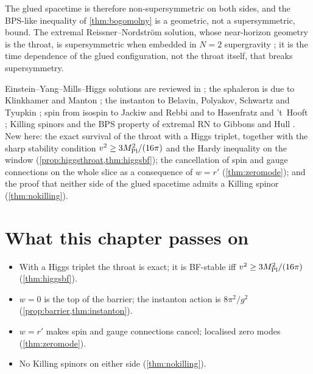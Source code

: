 The glued spacetime is therefore non-supersymmetric on both sides, and the BPS-like inequality of \cref{thm:bogomolny} is a geometric, not a supersymmetric, bound. The extremal Reissner--Nordstr\"om solution, whose near-horizon geometry is the throat, is supersymmetric when embedded in $N=2$ supergravity \cite{GibbonsHull1982}; it is the time dependence of the glued configuration, not the throat itself, that breaks supersymmetry.

\begin{litbox}
Einstein--Yang--Mills--Higgs solutions are reviewed in \cite{VolkovGaltsov1999}; the sphaleron is due to Klinkhamer and Manton \cite{KlinkhamerManton1984}; the instanton to Belavin, Polyakov, Schwartz and Tyupkin \cite{BPST1975}; spin from isospin to Jackiw and Rebbi and to Hasenfratz and 't~Hooft \cite{JackiwRebbi1976}; Killing spinors and the BPS property of extremal RN to Gibbons and Hull \cite{GibbonsHull1982}. New here: the exact survival of the throat with a Higgs triplet, together with the sharp stability condition $v^2\ge3M_{\rm Pl}^2/(16\pi)$ and the Hardy inequality on the window (\cref{prop:higgsthroat,thm:higgsbf}); the cancellation of spin and gauge connections on the whole slice as a consequence of $w=r'$ (\cref{thm:zeromode}); and the proof that neither side of the glued spacetime admits a Killing spinor (\cref{thm:nokilling}).
\end{litbox}

\section*{What this chapter passes on}
\begin{itemize}[nosep]
\item With a Higgs triplet the throat is exact; it is BF-stable iff $v^2\ge3M_{\rm Pl}^2/(16\pi)$ (\cref{thm:higgsbf}).
\item $w=0$ is the top of the barrier; the instanton action is $8\pi^2/g^2$ (\cref{prop:barrier,thm:instanton}).
\item $w=r'$ makes spin and gauge connections cancel; localised zero modes (\cref{thm:zeromode}).
\item No Killing spinors on either side (\cref{thm:nokilling}).
\end{itemize}

